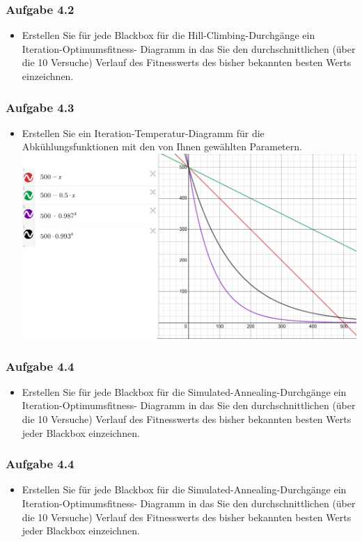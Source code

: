 \documentclass[xcolor=pdftex,dvipsnames,table]{beamer}
\begin{document}
\begin{frame}
  \frametitle{Aufgabe 4.2}
  \begin{itemize}
  		\item Erstellen Sie für jede Blackbox für die Hill-Climbing-Durchgänge ein Iteration-Optimumsfitness-
Diagramm in das Sie den durchschnittlichen (über die 10 Versuche) Verlauf des Fitnesswerts des
bisher bekannten besten Werts einzeichnen.
  \end{itemize}
\end{frame}

\begin{frame}
  \frametitle{Aufgabe 4.3}
  \begin{itemize}
  		\item Erstellen Sie ein Iteration-Temperatur-Diagramm für die Abkühlungsfunktionen mit den von
Ihnen gewählten Parametern.
\newline
\includegraphics[scale=0.3]{img/OC2_Blatt6_A4_3.png}
  \end{itemize}
\end{frame}


\begin{frame}
  \frametitle{Aufgabe 4.4}
  \begin{itemize}
  		\item Erstellen Sie für jede Blackbox für die Simulated-Annealing-Durchgänge ein Iteration-Optimumsfitness-
Diagramm in das Sie den durchschnittlichen (über die 10 Versuche) Verlauf des Fitnesswerts
des bisher bekannten besten Werts jeder Blackbox einzeichnen.
  \end{itemize}
\end{frame}

\begin{frame}
  \frametitle{Aufgabe 4.4}
  \begin{itemize}
  		\item Erstellen Sie für jede Blackbox für die Simulated-Annealing-Durchgänge ein Iteration-Optimumsfitness-
Diagramm in das Sie den durchschnittlichen (über die 10 Versuche) Verlauf des Fitnesswerts
des bisher bekannten besten Werts jeder Blackbox einzeichnen.
  \end{itemize}
\end{frame}
\end{document}
